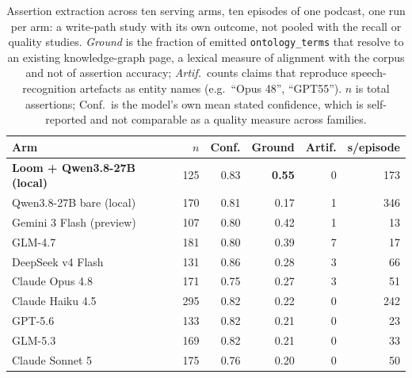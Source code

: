 \documentclass[10pt,twocolumn]{article}
\begin{document}
\begin{table}[t]\centering\small
\caption{Assertion extraction across ten serving arms, ten episodes of one podcast, one run per arm: a
write-path study with its own outcome, not pooled with the recall or quality studies. \emph{Ground}
is the fraction of emitted \texttt{ontology\_terms} that resolve to an existing knowledge-graph
page, a lexical measure of alignment with the corpus and not of assertion accuracy; \emph{Artif.}\ counts claims that reproduce speech-recognition artefacts as
entity names (e.g.\ ``Opus 48'', ``GPT55''). $n$ is total assertions; Conf.\ is the model's own
mean stated confidence, which is self-reported and not comparable as a quality measure across
families.}
\label{tab:casestudy}
\renewcommand{\arraystretch}{1.15}
\begin{tabular}{@{}lrrrrr@{}}
\toprule
Arm & $n$ & Conf. & Ground & Artif. & s/episode \\
\midrule
\textbf{Loom + Qwen3.8-27B (local)} & 125 & 0.83 & \textbf{0.55} & 0 & 173 \\
Qwen3.8-27B bare (local)            & 170 & 0.81 & 0.17 & 1 & 346 \\
\midrule
Gemini 3 Flash (preview)            & 107 & 0.80 & 0.42 & 1 & 13 \\
GLM-4.7                             & 181 & 0.80 & 0.39 & 7 & 17 \\
DeepSeek v4 Flash                   & 131 & 0.86 & 0.28 & 3 & 66 \\
Claude Opus 4.8                     & 171 & 0.75 & 0.27 & 3 & 51 \\
Claude Haiku 4.5                    & 295 & 0.82 & 0.22 & 0 & 242 \\
GPT-5.6                             & 133 & 0.82 & 0.21 & 0 & 23 \\
GLM-5.3                             & 169 & 0.82 & 0.21 & 0 & 33 \\
Claude Sonnet 5                     & 175 & 0.76 & 0.20 & 0 & 50 \\
\bottomrule
\end{tabular}
\end{table}
\end{document}
